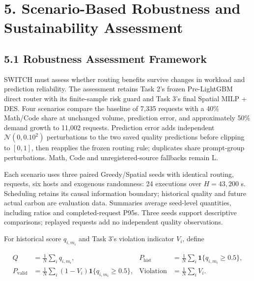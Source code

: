 \section{5. Scenario-Based Robustness and Sustainability
Assessment}\label{sec:task4-scenario-based-robustness-and-sustainability-assessment}

\subsection{5.1 Robustness Assessment
Framework}\label{sec:task4-robustness-assessment-framework}

SWITCH must assess whether routing benefits survive changes in workload
and prediction reliability. The assessment retains Task 2's frozen
Pre-LightGBM direct router with its finite-sample risk guard and Task
3's final Spatial MILP + DES. Four scenarios compare the baseline of
7,335 requests with a 40\% Math/Code share at unchanged volume,
prediction error, and approximately 50\% demand growth to 11,002
requests. Prediction error adds independent \(\mathcal N(0,0.10^2)\)
perturbations to the two saved quality predictions before clipping to
\([0,1]\), then reapplies the frozen routing rule; duplicates share
prompt-group perturbations. Math, Code and unregistered-source fallbacks
remain L.

Each scenario uses three paired Greedy/Spatial seeds with identical
routing, requests, six hosts and exogenous randomness: 24 executions
over \(H=43{,}200\) s. Scheduling retains its causal information
boundary; historical quality and future actual carbon are evaluation
data. Summaries average seed-level quantities, including ratios and
completed-request P95s. Three seeds support descriptive comparisons;
replayed requests add no independent quality observations.

For historical score \(q_{i,m_i}\) and Task 3's violation indicator
\(V_i\), define

\[
\begin{aligned}
Q&=\frac1N\sum_i q_{i,m_i},& P_{\mathrm{hist}}&=\frac1N\sum_i\mathbf1\{q_{i,m_i}\ge0.5\},\\
P_{\mathrm{valid}}&=\frac1N\sum_i(1-V_i)\mathbf1\{q_{i,m_i}\ge0.5\},&
\mathrm{Violation}&=\frac1N\sum_i V_i.
\end{aligned}
\tag{5.1}
\]

